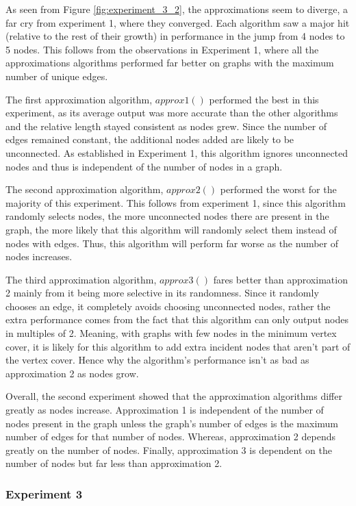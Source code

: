 \documentclass[titlepage]{article}
\begin{document}
As seen from Figure \ref{fig:experiment_3_2}, the approximations seem to diverge, a far cry from experiment 1, where they converged. Each algorithm saw a major hit (relative to the rest of their growth) in performance in the jump from 4 nodes to 5 nodes. This follows from the observations in Experiment 1, where all the approximations algorithms performed far better on graphs with the maximum number of unique edges.

The first approximation algorithm, $approx1()$ performed the best in this experiment, as its average output was more accurate than the other algorithms and the relative length stayed consistent as nodes grew. Since the number of edges remained constant, the additional nodes added are likely to be unconnected. As established in Experiment 1, this algorithm ignores unconnected nodes and thus is independent of the number of nodes in a graph.

The second approximation algorithm, $approx2()$ performed the worst for the majority of this experiment. This follows from experiment 1, since this algorithm randomly selects nodes, the more unconnected nodes there are present in the graph, the more likely that this algorithm will randomly select them instead of nodes with edges. Thus, this algorithm will perform far worse as the number of nodes increases.

The third approximation algorithm, $approx3()$ fares better than approximation 2 mainly from it being more selective in its randomness. Since it randomly chooses an edge, it completely avoids choosing unconnected nodes, rather the extra performance comes from the fact that this algorithm can only output nodes in multiples of 2. Meaning, with graphs with few nodes in the minimum vertex cover, it is likely for this algorithm to add extra incident nodes that aren't part of the vertex cover. Hence why the algorithm's performance isn't as bad as approximation 2 as nodes grow.

Overall, the second experiment showed that the approximation algorithms differ greatly as nodes increase. Approximation 1 is independent of the number of nodes present in the graph unless the graph's number of edges is the maximum number of edges for that number of nodes. Whereas, approximation 2 depends greatly on the number of nodes. Finally, approximation 3 is dependent on the number of nodes but far less than approximation 2.

\subsubsection{Experiment 3}
\end{document}
